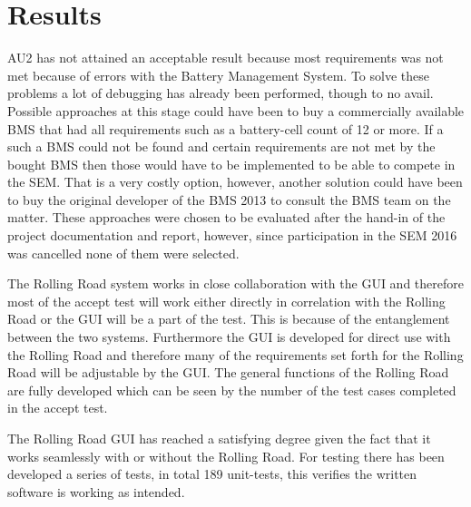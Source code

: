 \chapter{Results}
AU2 has not attained an acceptable result because most requirements  was not met because of errors with the Battery Management System. To solve these problems a lot of debugging has already been performed, though to no avail. Possible approaches at this stage could have been to buy a commercially available BMS that had all requirements such as a battery-cell count of 12 or more. If a such a BMS could not be found and certain requirements are not met by the bought BMS then those would have to be implemented to be able to compete in the SEM. That is a very costly option, however, another solution could have been to buy the original developer of the BMS 2013 to consult the BMS team on the matter. These approaches were chosen to be evaluated after the hand-in of the project documentation and report, however, since participation in the SEM 2016 was cancelled none of them were selected. 

The Rolling Road system works in close collaboration with the GUI and therefore most of the accept test will work either directly in correlation with the Rolling Road or the GUI will be a part of the test. This is because of the entanglement between the two systems. Furthermore the GUI is developed for direct use with the Rolling Road and therefore many of the requirements set forth for the Rolling Road will be adjustable by the GUI. The general functions of the Rolling Road are fully developed which can be seen by the number of the test cases completed in the accept test.   

The Rolling Road GUI has reached a satisfying degree given the fact that it works seamlessly with or without the Rolling Road. For testing there has been developed a series of tests, in total 189 unit-tests, this verifies the written software is working as intended. 

